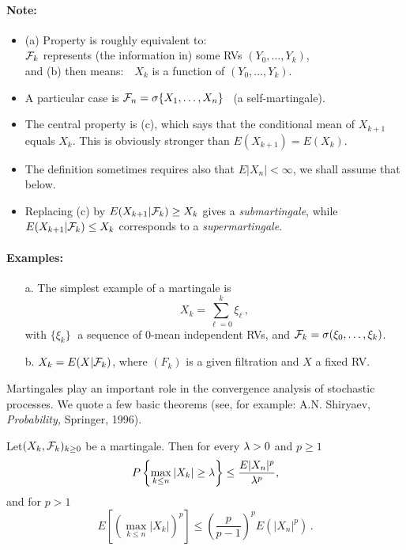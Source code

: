 \paragraph{Note:}
\begin{itemize}
\item
(a) Property is roughly equivalent to:\\
\hspace*{2cm}$\mathcal F_k$ represents (the information in)
some RVs $(Y_0, \ldots, Y_k)$,
\\
and (b) then means:\ \
$X_k$  is a function of $(Y_0, \ldots, Y_k)$.
\item
A particular case is $\mathcal F_n=\sigma\{X_1,\dots,X_n\}$
\ (a self-martingale).
\item
The central property is (c), which says that the conditional mean
of $X_{k+1}$ equals $X_k$. This is obviously
stronger than  $E(X_{k+1})=E(X_k)$.
\item
The definition sometimes requires also that $E|X_n|<\infty$,
we shall assume that below.
\item
Replacing (c) by $E(X_{k+1} | \mathcal F_k) \geq X_k$ gives a {\em submartingale},
while $E(X_{k+1} | \mathcal F_k) \leq X_k$ corresponds to a {\em supermartingale}.
\end{itemize}

\paragraph{Examples:}
\begin{itemize}
\item[a.]
The simplest {example} of a martingale is
$$
X_k = \sum_{\ell=0}^k \xi_\ell\,,
$$
with $\{\xi_k\}\;$ a sequence of 0-mean independent RVs, and
$\mathcal F_k= \sigma (\xi_0, \ldots, \xi_k)$.
\item[b.]
$X_k=E(X|\mathcal F_k)$, where $(F_k)$ is a given filtration and $X$ a fixed RV.
\end{itemize}

Martingales play an important role in the convergence analysis of
stochastic processes. We quote a few basic theorems
(see, for example: A.N. Shiryaev, {\it Probability,} Springer, 1996).

\begin{theorem}

Let$(X_k, \mathcal F_k)_{k\ge 0}$ be a martingale. Then for every $\lambda>0$ and $p\ge 1$
$$
P\left\{ \max_{k\le n} |X_k| \ge \lambda \right\} \le \frac{E |X_n|^p}{\lambda^p},
$$
and for $p>1$
$$
E[(\max_{k\le n}|X_k|)^p ] \le \textstyle{(\frac{p}{p-1})^p} E(|X_n|^p) \,.
$$
\end{theorem}


